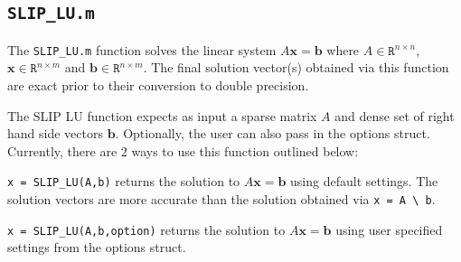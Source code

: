 \documentclass[11pt]{article}
\theoremstyle{definition}
\begin{document}
\cprotect\subsection{\verb|SLIP_LU.m|} \label{s:Use:MATLAB:factor}

The \verb|SLIP_LU.m| function solves the linear system $A \mathbf{x} = \mathbf{b}$ where $A \in \mathtt{R}^{n \times n}$, $\mathbf{x} \in \mathtt{R}^{n \times m}$ and $\mathbf{b} \in \mathtt{R}^{n \times m}$. The final solution vector(s) obtained via this function are exact prior to their conversion to double precision.

The SLIP LU function expects as input a sparse matrix $A$ and dense set of right hand side vectors $\mathbf{b}$. Optionally, the user can also pass in the options struct. Currently, there are 2 ways to use this function outlined below:

\verb|x = SLIP_LU(A,b)| returns the solution to $A \mathbf{x} = \mathbf{b}$ using default settings. The solution vectors are more accurate than the solution obtained via \verb|x = A \ b|.

\verb|x = SLIP_LU(A,b,option)| returns the solution to $A \mathbf{x} = \mathbf{b}$ using user specified settings from the options struct.

\newpage



\end{document}
